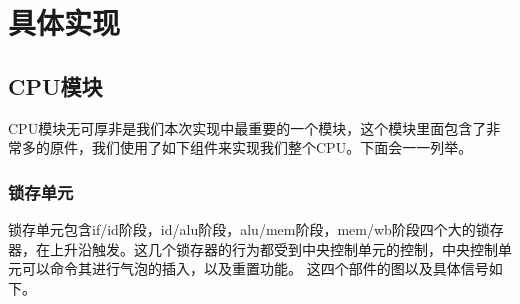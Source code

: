\section{具体实现}
\subsection{CPU模块}
    CPU模块无可厚非是我们本次实现中最重要的一个模块，这个模块里面包含了非常多的原件，我们使用了如下组件来实现我们整个CPU。下面会一一列举。
\subsubsection{锁存单元}
    锁存单元包含if/id阶段，id/alu阶段，alu/mem阶段，mem/wb阶段四个大的锁存器，在上升沿触发。这几个锁存器的行为都受到中央控制单元的控制，中央控制单元可以命令其进行气泡的插入，以及重置功能。
    这四个部件的图以及具体信号如下。

